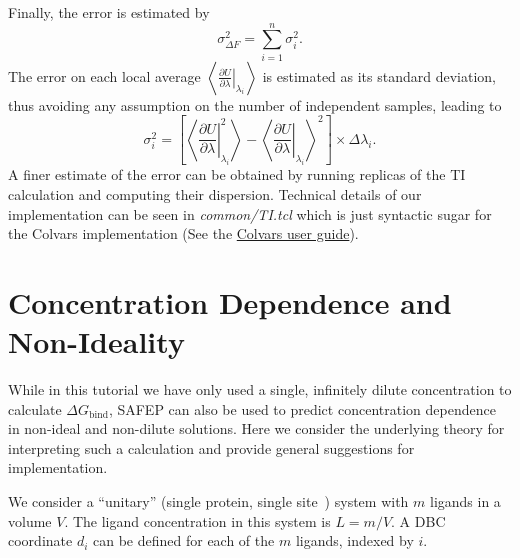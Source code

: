 \documentclass[9pt,tutorial,pubversion]{Styling/livecoms}
\newcommand{\filepath}[1]{\textit{#1}}
\begin{document}
Finally, the error is estimated by
\begin{equation} \label{eq:TI_error}
    \sigma^2_{\Delta F} = \sum_{i=1}^n \sigma_i^2.
\end{equation}
The error on each local average $\left\langle \left. \frac{\partial U}{\partial \lambda} \right|_{\lambda_i} \right\rangle$ is estimated as its standard deviation, thus avoiding any assumption on the number of independent samples, leading to
\begin{equation} \label{eq:TI_increment_error}
    \sigma_i^2 = \left[
    \left\langle \left. \frac{\partial U}{\partial \lambda} \right|_{\lambda_i}^2 \right \rangle - 
    \left\langle \left. \frac{\partial U}{\partial \lambda} \right|_{\lambda_i} \right\rangle^2
    \right] \times \Delta \lambda_i.
\end{equation}
A finer estimate of the error can be obtained by running replicas of the TI calculation and computing their dispersion.
Technical details of our implementation can be seen in \filepath{common/TI.tcl} which is just syntactic sugar for the Colvars implementation (See the \href{http://colvars.github.io/colvars-refman-vmd/colvars-refman-vmd.html#sec:colvarbias_ti}{Colvars user guide}).


\section{Concentration Dependence and Non-Ideality} \label{app:bindingProbability}

While in this tutorial we have only used a single, infinitely dilute concentration to calculate  $\Delta G_\mathrm{bind}$, SAFEP can also be used to predict concentration dependence in non-ideal and non-dilute solutions.  Here we consider the underlying theory for interpreting such a calculation and provide general suggestions for implementation.

We consider a ``unitary'' (single protein, single site~\cite{Salari2018}) system with $m$ ligands in a volume $V$. The ligand concentration in this system is $L=m/V$. A DBC coordinate $d_i$ can be defined for each of the $m$ ligands, indexed by $i$.  
\end{document}

